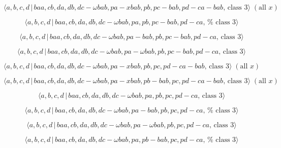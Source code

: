 \documentclass[10pt]{article}
\begin{document}
\begin{equation}
\langle a,b,c,d\,|\,baa,cb,da,db,dc-\omega bab,pa-xbab,pb,pc-bab,pd-ca-bab,\,%
\text{class }3\rangle \;(\text{all }x)  \tag{7.4034}
\end{equation}

\begin{equation}
\langle a,b,c,d\,|\,baa,cb,da,db,dc-\omega bab,pa,pb,pc-bab,pd-ca,\,\text{%
class }3\rangle  \tag{7.4035}
\end{equation}

\begin{equation}
\langle a,b,c,d\,|\,baa,cb,da,db,dc-\omega bab,pa-bab,pb,pc-bab,pd-ca,\,%
\text{class }3\rangle  \tag{7.4036}
\end{equation}

\begin{equation}
\langle a,b,c,d\,|\,baa,cb,da,db,dc-\omega bab,pa-\omega
bab,pb,pc-bab,pd-ca,\,\text{class }3\rangle  \tag{7.4037}
\end{equation}

\begin{equation}
\langle a,b,c,d\,|\,baa,cb,da,db,dc-\omega bab,pa-xbab,pb,pc,pd-ca-bab,\,%
\text{class }3\rangle \;(\text{all }x)  \tag{7.4038}
\end{equation}

\begin{equation}
\langle a,b,c,d\,|\,baa,cb,da,db,dc-\omega bab,pa-xbab,pb-bab,pc,pd-ca-bab,\,%
\text{class }3\rangle \;(\text{all }x)  \tag{7.4039}
\end{equation}

\begin{equation}
\langle a,b,c,d\,|\,baa,cb,da,db,dc-\omega bab,pa,pb,pc,pd-ca,\,\text{class }%
3\rangle  \tag{7.4040}
\end{equation}

\begin{equation}
\langle a,b,c,d\,|\,baa,cb,da,db,dc-\omega bab,pa-bab,pb,pc,pd-ca,\,\text{%
class }3\rangle  \tag{7.4041}
\end{equation}

\begin{equation}
\langle a,b,c,d\,|\,baa,cb,da,db,dc-\omega bab,pa-\omega bab,pb,pc,pd-ca,\,%
\text{class }3\rangle  \tag{7.4042}
\end{equation}

\begin{equation}
\langle a,b,c,d\,|\,baa,cb,da,db,dc-\omega bab,pa,pb-bab,pc,pd-ca,\,\text{%
class }3\rangle  \tag{7.4043}
\end{equation}
\end{document}
